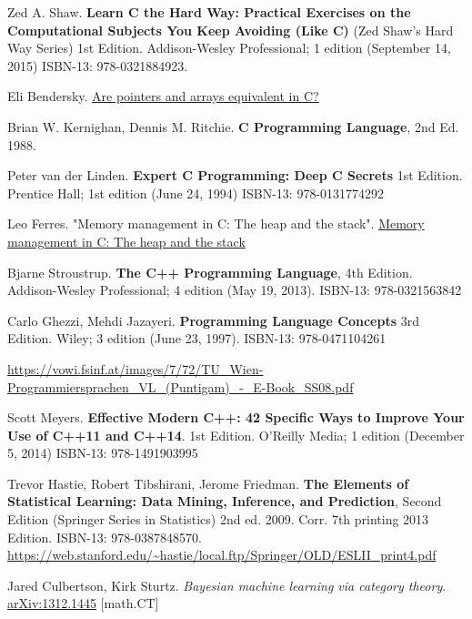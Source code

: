 \documentclass[10pt]{amsart}
\begin{document}
\begin{thebibliography}{9}

Zed A. Shaw.  \textbf{Learn C the Hard Way: Practical Exercises on the Computational Subjects You Keep Avoiding (Like C)} (Zed Shaw's Hard Way Series) 1st Edition.  Addison-Wesley Professional; 1 edition (September 14, 2015) ISBN-13: 978-0321884923.  

Eli Bendersky.   \href{https://eli.thegreenplace.net/2009/10/21/are-pointers-and-arrays-equivalent-in-c}{Are pointers and arrays equivalent in C?}

Brian W. Kernighan, Dennis M. Ritchie.  \textbf{C Programming Language}, 2nd Ed. 1988.   

Peter van der Linden.  \textbf{Expert C Programming: Deep C Secrets} 1st Edition.  Prentice Hall; 1st edition (June 24, 1994)  ISBN-13: 978-0131774292

Leo Ferres.  "Memory management in C: The heap and the stack".  \href{http://www.inf.udec.cl/~leo/teoX.pdf}{Memory management in C: The heap and the stack}



Bjarne Stroustrup.  \textbf{The C++ Programming Language}, 4th Edition. Addison-Wesley Professional; 4 edition (May 19, 2013).  ISBN-13: 978-0321563842

Carlo Ghezzi, Mehdi Jazayeri.  \textbf{Programming Language Concepts} 3rd Edition.  Wiley; 3 edition (June 23, 1997).  ISBN-13: 978-0471104261  

\url{https://vowi.fsinf.at/images/7/72/TU_Wien-Programmiersprachen_VL_(Puntigam)_-_E-Book_SS08.pdf}


Scott Meyers.  \textbf{Effective Modern C++: 42 Specific Ways to Improve Your Use of C++11 and C++14}. 1st Edition.  O'Reilly Media; 1 edition (December 5, 2014)  ISBN-13: 978-1491903995



Trevor Hastie, Robert Tibshirani, Jerome Friedman.   \textbf{The Elements of Statistical Learning: Data Mining, Inference, and Prediction}, Second Edition (Springer Series in Statistics) 2nd ed. 2009. Corr. 7th printing 2013 Edition.  ISBN-13: 978-0387848570.  \url{https://web.stanford.edu/~hastie/local.ftp/Springer/OLD/ESLII_print4.pdf}

Jared Culbertson, Kirk Sturtz.  \emph{Bayesian machine learning via category theory}.  \href{http://arxiv.org/abs/1312.1445}{arXiv:1312.1445} [math.CT]


\end{thebibliography}
\end{document}
